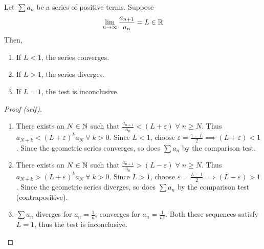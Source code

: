 \documentclass[12pt]{article}
\begin{document}
\begin{thm} \label{thm:ratio test}
    Let $\sum a_{n}$ be a series of positive terms. Suppose \[
        \lim_{n \to \infty} \frac{a_{n+1}}{a_{n}} = L \in \mathbb{R}
    \] Then,
    \begin{enumerate}[label=(\alph*)]
        \item If $L < 1$, the series converges.
        \item If $L > 1$, the series diverges.
        \item If $L = 1$, the test is inconclusive.
    \end{enumerate}
\end{thm}
\begin{proof}[Proof \textcolor{red!70!black}{(self)}]
    \begin{enumerate}[label=(\alph*)]
        \item There exists an $N \in \mathbb{N}$ such that $\frac{a_{n+1}}{a_{n}} < (L + \varepsilon) \;\forall\; n \geq N$. Thus $a_{N+k} < (L + \varepsilon)^{k} a_{N} \;\forall\; k > 0$. Since $L < 1$, choose $\varepsilon = \frac{1 - L}{2} \implies (L + \varepsilon) < 1$. Since the geometric series converges, so does $\sum a_{n}$ by the comparison test.
        \item There exists an $N \in \mathbb{N}$ such that $\frac{a_{n+1}}{a_{n}} > (L - \varepsilon) \;\forall\; n \geq N$. Thus $a_{N+k} > (L + \varepsilon)^{k} a_{N} \;\forall\; k > 0$. Since $L > 1$, choose $\varepsilon = \frac{L - 1}{2} \implies (L - \varepsilon) > 1$. Since the geometric series diverges, so does $\sum a_{n}$ by the comparison test (contrapositive).
        \item $\sum a_{n}$ diverges for $a_{n} = \frac{1}{n}$, converges for $a_{n} = \frac{1}{n^{2}}$. Both these sequences satisfy $L = 1$, thus the test is inconclusive.
    \end{enumerate}
\end{proof}
\end{document}
